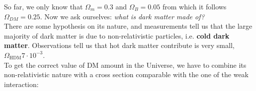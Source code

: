 \documentclass[10.75pt,a4paper,openright,bottom=2cm]{article}
\begin{document}
So far, we only know that $\Omega_m=0.3$ and $\Omega_B=0.05$ from which it follows $\Omega_{DM}=0.25$. Now we ask ourselves: \textit{what is dark matter made of?}\\
There are some hypothesis on its nature, 
and measurements tell us that the large majority of dark matter is due to non-relativistic particles, i.e. \textbf{cold dark matter}. Observations tell us that hot dark matter contribute is very small, $\Omega_{\text{HDM}}7\cdot10^{-3}$.\\
To get the correct value of DM amount in the Universe, we have to combine its non-relativistic nature with a cross section comparable with the one of the weak interaction:
\end{document}
